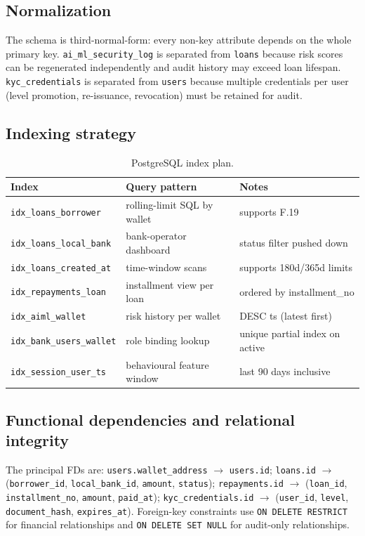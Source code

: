 \documentclass[12pt,a4paper]{report}
\begin{document}
\subsection{Normalization}
The schema is third-normal-form: every non-key attribute depends on the whole primary key. \texttt{ai\_ml\_security\_log} is separated from \texttt{loans} because risk scores can be regenerated independently and audit history may exceed loan lifespan. \texttt{kyc\_credentials} is separated from \texttt{users} because multiple credentials per user (level promotion, re-issuance, revocation) must be retained for audit.

\subsection{Indexing strategy}
\label{sec:indexing}

\begin{table}[!t]
\centering
\caption{PostgreSQL index plan.}
\label{tab:indexing}
\small
\begin{tabularx}{\linewidth}{@{}p{4.4cm}YL{4.2cm}@{}}
\toprule
\textbf{Index} & \textbf{Query pattern} & \textbf{Notes} \\
\midrule
\texttt{idx\_loans\_borrower} & rolling-limit SQL by wallet & supports F.19 \\
\texttt{idx\_loans\_local\_bank} & bank-operator dashboard & status filter pushed down \\
\texttt{idx\_loans\_created\_at} & time-window scans & supports 180d/365d limits \\
\texttt{idx\_repayments\_loan} & installment view per loan & ordered by installment\_no \\
\texttt{idx\_aiml\_wallet} & risk history per wallet & DESC ts (latest first) \\
\texttt{idx\_bank\_users\_wallet} & role binding lookup & unique partial index on active \\
\texttt{idx\_session\_user\_ts} & behavioural feature window & last 90 days inclusive \\
\bottomrule
\end{tabularx}
\end{table}

\subsection{Functional dependencies and relational integrity}
The principal FDs are: \texttt{users.wallet\_address} $\to$ \texttt{users.id}; \texttt{loans.id} $\to$ (\texttt{borrower\_id}, \texttt{local\_bank\_id}, \texttt{amount}, \texttt{status}); \texttt{repayments.id} $\to$ (\texttt{loan\_id}, \texttt{installment\_no}, \texttt{amount}, \texttt{paid\_at}); \texttt{kyc\_credentials.id} $\to$ (\texttt{user\_id}, \texttt{level}, \texttt{document\_hash}, \texttt{expires\_at}). Foreign-key constraints use \texttt{ON DELETE RESTRICT} for financial relationships and \texttt{ON DELETE SET NULL} for audit-only relationships.
\end{document}
